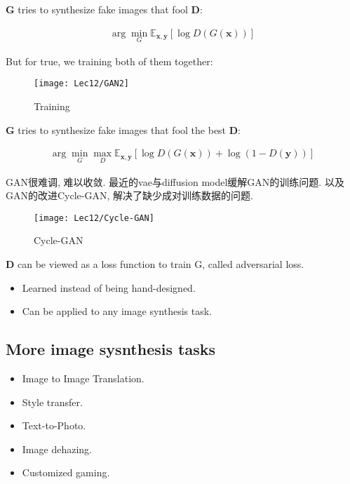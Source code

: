 \textbf{G} tries to synthesize fake images that \textcolor{light_red}{fool} \textbf{D}: 

\begin{align*}
    \arg \min_G \mathbb{E}_{\mathbf{x,y}}\left[ \log D(G(\mathbf{x})) \right]
\end{align*}

But for true, we training both of them together: 

\begin{figure}[H]
    \centering
    \texttt{[image: Lec12/GAN2]}
    \caption{Training}
\end{figure}

\textbf{G} tries to synthesize fake images that \textcolor{light_red}{fool} the \textcolor{light_blue}{best} \textbf{D}:

\begin{align*}
    \arg \min_G \max_D \mathbb{E}_{\mathbf{x,y}}\left[ \log D(G(\mathbf{x}))+\log (1-D(\mathbf{y})) \right]
\end{align*}

GAN很难调, 难以收敛. 最近的vae与diffusion model缓解GAN的训练问题. 以及GAN的改进Cycle-GAN, 解决了缺少成对训练数据的问题. 

\begin{figure}[H]
    \centering
    \texttt{[image: Lec12/Cycle-GAN]}
    \caption{Cycle-GAN}
\end{figure}


\textbf{D} can be viewed as a loss function to train G, called \textcolor{light_red}{adversarial loss}. 
\begin{itemize}
    \item Learned instead of being hand-designed. 
    \item Can be applied to any image synthesis task. 
\end{itemize}

\subsection{More image sysnthesis tasks}
\begin{itemize}
    \item Image to Image Translation. 
    \item Style transfer. 
    \item Text-to-Photo. 
    \item Image dehazing. 
    \item Customized gaming. 
\end{itemize}

